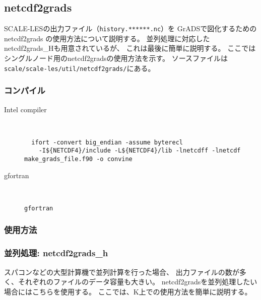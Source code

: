 \subsection{netcdf2grads}

SCALE-LESの出力ファイル（\verb|history.******.nc|）を
GrADSで図化するためのnetcdf2grads の使用方法について説明する。
並列処理に対応したnetcdf2grads\_Hも用意されているが、
これは最後に簡単に説明する。
ここではシングルノード用のnetcdf2gradsの使用方法を示す。
ソースファイルは \verb|scale/scale-les/util/netcdf2grads/|にある。

\subsubsection{コンパイル}

\begin{description}
\item[Intel compiler]\mbox{}\\
 \begin{verbatim}
  ifort -convert big_endian -assume byterecl
    -I${NETCDF4}/include -L${NETCDF4}/lib -lnetcdff -lnetcdf make_grads_file.f90 -o convine
  \end{verbatim}
\item[gfortran]\mbox{}\\
\begin{verbatim}
gfortran
\end{verbatim}
\end{description}

\subsubsection{使用方法}


\subsubsection{並列処理: netcdf2grads\_h}

スパコンなどの大型計算機で並列計算を行った場合、
出力ファイルの数が多く、それぞれのファイルのデータ容量も大きい。
netcdf2gradsを並列処理したい場合にはこちらを使用する。
ここでは、K上での使用方法を簡単に説明する。

